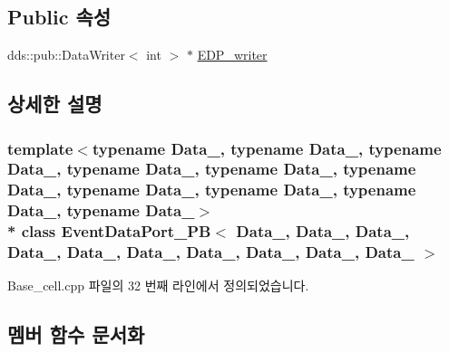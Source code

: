 \subsection*{Public 속성}
\begin{DoxyCompactItemize}
\item 
dds\+::pub\+::\+Data\+Writer$<$ int $>$ $\ast$ \hyperlink{classEventDataPort__PB_af4f01ada6acf6d431c9d8e799f9b1ad0}{E\+D\+P\+\_\+writer}
\end{DoxyCompactItemize}


\subsection{상세한 설명}
\subsubsection*{template$<$typename Data\+\_, typename Data\+\_, typename Data\+\_, typename Data\+\_, typename Data\+\_, typename Data\+\_, typename Data\+\_, typename Data\+\_, typename Data\+\_, typename Data\+\_$>$\\*
class Event\+Data\+Port\+\_\+\+P\+B$<$ Data\+\_, Data\+\_, Data\+\_, Data\+\_, Data\+\_, Data\+\_, Data\+\_, Data\+\_, Data\+\_, Data\+\_ $>$}



Base\+\_\+cell.\+cpp 파일의 32 번째 라인에서 정의되었습니다.



\subsection{멤버 함수 문서화}
